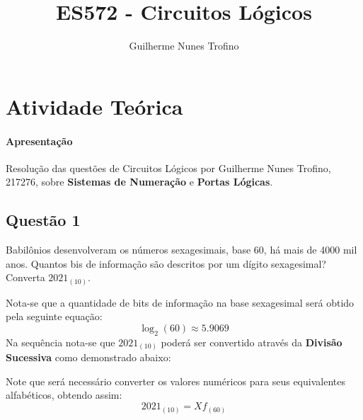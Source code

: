 \documentclass{article}
\title{ES572 - Circuitos Lógicos}
\author{Guilherme Nunes Trofino}
\begin{document}
    \maketitle
\newpage

    \section{Atividade Teórica}
        \paragraph{Apresentação}Resolução das questões de Circuitos Lógicos por Guilherme Nunes Trofino, 217276, sobre \textbf{Sistemas de Numeração} e \textbf{Portas Lógicas}.

        \subsection{Questão 1}
            \begin{exercise}
                Babilônios desenvolveram os números sexagesimais, base 60, há mais de 4000 mil anos. Quantos bis de informação são descritos por um dígito sexagesimal? Converta $2021_{(10)}$.
            \end{exercise}
            \begin{resolution}
                Nota-se que a quantidade de bits de informação na base sexagesimal será obtido pela seguinte equação:
                    \begin{equation*}
                        \boxed{\log_{2}(60) \approx 5.9069}
                    \end{equation*}
                Na sequência nota-se que $2021_{(10)}$ poderá ser convertido através da \textbf{Divisão Sucessiva} como demonstrado abaixo:
                    \begin{figure}[H]
                        \centering
                    \end{figure}
                Note que será necessário converter os valores numéricos para seus equivalentes alfabéticos, obtendo assim:
                    \begin{equation*}
                        \boxed{2021_{(10)} = Xf_{(60)}}
                    \end{equation*}
            \end{resolution}
\newpage
\end{document}
